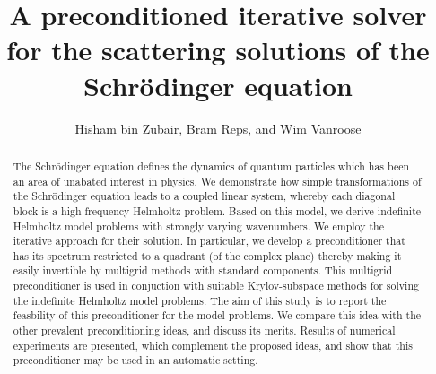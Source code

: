 \documentclass[mathpazo]{cicp}
\theoremstyle{definition}
\numberwithin{equation}{section}
\providecommand{\hbz}{}
\begin{document}
\title[Iterative solution of Sch\"odinger equation]{A preconditioned iterative solver for the scattering solutions of the Schr\"odinger equation}



\author[Hisham bin Zubair et.~al.]{Hisham bin Zubair\comma\corrauth, Bram Reps, and Wim Vanroose}
\address{\ Department of Mathematical Sciences, Faculty of Computer Science, Institute of Business Administration, University Rd., 75270 Karachi, Pakistan. \\
\ Department of Mathematics and Computer Science, Universiteit Antwerpen, Middelheimlaan 1, B-2020 Antwerpen, Belgium.}





\begin{abstract}
The Schr\"odinger equation defines the dynamics of quantum particles which
 has been an area of unabated interest in physics. We demonstrate how simple 
transformations of the Schr\"odinger equation leads to a coupled linear system,
 whereby each diagonal block is a high frequency Helmholtz problem. Based on this model, 
we derive indefinite Helmholtz model problems \hbz{with strongly varying wavenumbers. We employ the iterative approach for their solution. In particular, we develop} a  preconditioner that has its spectrum restricted to a quadrant \hbz{(of the complex plane) thereby making 
it easily invertible by multigrid methods with standard components. This multigrid preconditioner is used in conjuction with suitable Krylov-subspace methods for solving the indefinite Helmholtz model problems. The aim of this study is to report the feasbility of this preconditioner for the model problems.} We compare this idea with the other prevalent preconditioning ideas, \hbz{and discuss its merits}. Results of numerical experiments are presented, which complement the proposed ideas, and show that this preconditioner may be used in an automatic setting.
\end{abstract}




\maketitle
\end{document}
